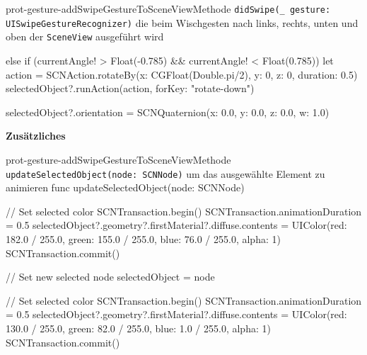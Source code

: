 \begin{description}
\begin{code}{prot-gesture-addSwipeGestureToSceneView}{Methode \texttt{didSwipe(\_ gesture: UISwipeGestureRecognizer)} die beim Wischgesten nach links, rechts, unten und oben der \texttt{SceneView} ausgeführt wird}
{{{            }
            else if (currentAngle! > Float(-0.785) && currentAngle! < Float(0.785)) {
                let action = SCNAction.rotateBy(x: CGFloat(Double.pi/2), y: 0, z: 0, duration: 0.5)
                selectedObject?.runAction(action, forKey: "rotate-down")
            }
            
        }
        selectedObject?.orientation = SCNQuaternion(x: 0.0, y: 0.0, z: 0.0, w: 1.0)
    }
    \end{code}

    \textbf{Zusätzliches}\\

    \begin{code}{prot-gesture-addSwipeGestureToSceneView}{Methode \texttt{updateSelectedObject(node: SCNNode)} um das ausgewählte Element zu animieren}
    func updateSelectedObject(node: SCNNode) {
        // Set selected color
        SCNTransaction.begin()
        SCNTransaction.animationDuration = 0.5
        selectedObject?.geometry?.firstMaterial?.diffuse.contents = UIColor(red: 182.0 / 255.0, green: 155.0 / 255.0, blue: 76.0 / 255.0, alpha: 1)
        SCNTransaction.commit()
        
        // Set new selected node
        selectedObject = node
        
        // Set selected color
        SCNTransaction.begin()
        SCNTransaction.animationDuration = 0.5
        selectedObject?.geometry?.firstMaterial?.diffuse.contents = UIColor(red: 130.0 / 255.0, green: 82.0 / 255.0, blue: 1.0 / 255.0, alpha: 1)
        SCNTransaction.commit()
    }
    \end{code}
    

\end{description}    
